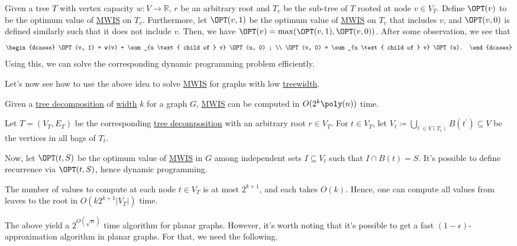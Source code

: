 \begin{eg}
	Given a tree \(T\) with vertex capacity \(w\colon V \to \mathbb{R} \), \(r\) be an arbitrary root and \(T_v\) be the sub-tree of \(T\) rooted at node \(v \in V_T\). Define \(\OPT(v)\) to be the optimum value of \hyperref[prb:MWIS]{MWIS} on \(T_v\). Furthermore, let \(\OPT(v, 1)\) be the optimum value of \hyperref[prb:MWIS]{MWIS} on \(T_v\) that includes \(v\), and \(\OPT(v, 0)\) is defined similarly such that it does not include \(v\). Then, we have \(\OPT(v) = \max (\OPT(v, 1), \OPT(v, 0))\). After some observation, we see that
	\[
		\begin{dcases}
			\OPT(v, 1) = w(v) + \sum_{u \text{ child of } v} \OPT(u, 0) ; \\
			\OPT(v, 0) = \sum_{u \text{ child of } v} \OPT(u).
		\end{dcases}
	\]
	Using this, we can solve the corresponding dynamic programming problem efficiently.
\end{eg}

Let's now see how to use the above idea to solve \hyperref[prb:MWIS]{MWIS} for graphs with low \hyperref[def:treewidth]{treewidth}.

\begin{eg}\label{eg:MWIS-tree-decomposition}
	Given a \hyperref[def:tree-decomposition]{tree decomposition} of \hyperref[def:tree-decomposition-width]{width} \(k\) for a graph \(G\), \hyperref[prb:MWIS]{MWIS} can be computed in \(O(2^k \poly(n))\) time.
\end{eg}
\begin{explanation}
	Let \(T = (V_T, E_T)\) be the corresponding \hyperref[def:tree-decomposition]{tree decomposition} with an arbitrary root \(r \in V_T\). For \(t \in V_T\), let \(V_t \coloneqq \bigcup_{t^{\prime} \in V(T_t)} B(t^{\prime} ) \subseteq V\) be the vertices in all bags of \(T_t\).

	Now, let \(\OPT(t, S)\) be the optimum value of \hyperref[prb:MWIS]{MWIS} in \(G\) among independent sets \(I \subseteq V_t\) such that \(I \cap B(t) = S\). It's possible to define recurrence via \(\OPT(t, S)\), hence dynamic programming.

	The number of values to compute at each node \(t \in V_T\) is at most \(2^{k+1}\), and each takes \(O(k)\). Hence, one can compute all values from leaves to the root in \(O(k 2^{k+1} \lvert V_T \rvert)\) time.
\end{explanation}

The above yield a \(2^{O(\sqrt{n} )}\) time algorithm for planar graphs. However, it's worth noting that it's possible to get a fast \((1 - \epsilon )\)-approximation algorithm in planar graphs. For that, we need the following.

